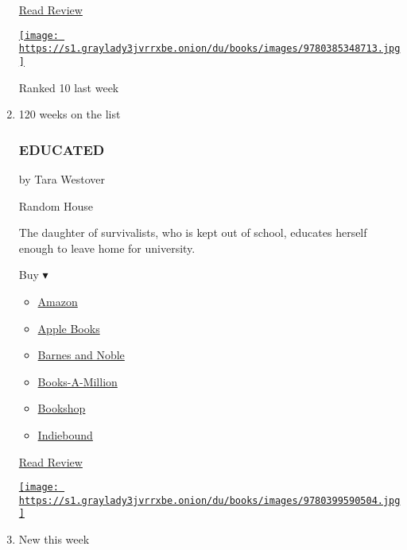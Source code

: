 \begin{enumerate}
  \href{https://www.nytimes3xbfgragh.onion/2020/02/25/books/review/the-splendid-and-the-vile-erik-larson.html}{Read
  Review}

  \href{https://www.nytimes3xbfgragh.onion/2020/02/25/books/review/the-splendid-and-the-vile-erik-larson.html}{\texttt{[image: https://s1.graylady3jvrrxbe.onion/du/books/images/9780385348713.jpg]}}

  Ranked 10 last week
\item
  \href{https://www.nytimes3xbfgragh.onion/2018/03/01/books/review/tara-westover-educated.html}{}

  120 weeks on the list

  \hypertarget{educated}{%
  \subsubsection{EDUCATED}\label{educated}}

  by Tara Westover

  Random House

  The daughter of survivalists, who is kept out of school, educates
  herself enough to leave home for university.

  Buy ▾

  \begin{itemize}
  \tightlist
  \item
    \href{https://www.amazon.com/Educated-Memoir-Tara-Westover/dp/0399590501?tag=NYTBS-20}{Amazon}
  \item
    \href{https://du-gae-books-dot-nyt-du-prd.appspot.com/buy?title=EDUCATED\&author=Tara+Westover}{Apple
    Books}
  \item
    \href{https://www.anrdoezrs.net/click-7990613-11819508?url=https\%3A\%2F\%2Fwww.barnesandnoble.com\%2Fw\%2F\%3Fean\%3D9780399590504}{Barnes
    and Noble}
  \item
    \href{https://www.anrdoezrs.net/click-7990613-35140?url=https\%3A\%2F\%2Fwww.booksamillion.com\%2Fp\%2FEDUCATED\%2FTara\%2BWestover\%2F9780399590504}{Books-A-Million}
  \item
    \href{https://bookshop.org/a/3546/9780399590504}{Bookshop}
  \item
    \href{https://www.indiebound.org/book/9780399590504?aff=NYT}{Indiebound}
  \end{itemize}

  \href{https://www.nytimes3xbfgragh.onion/2018/03/01/books/review/tara-westover-educated.html}{Read
  Review}

  \href{https://www.nytimes3xbfgragh.onion/2018/03/01/books/review/tara-westover-educated.html}{\texttt{[image: https://s1.graylady3jvrrxbe.onion/du/books/images/9780399590504.jpg]}}
\item
  New this week


\end{enumerate}
